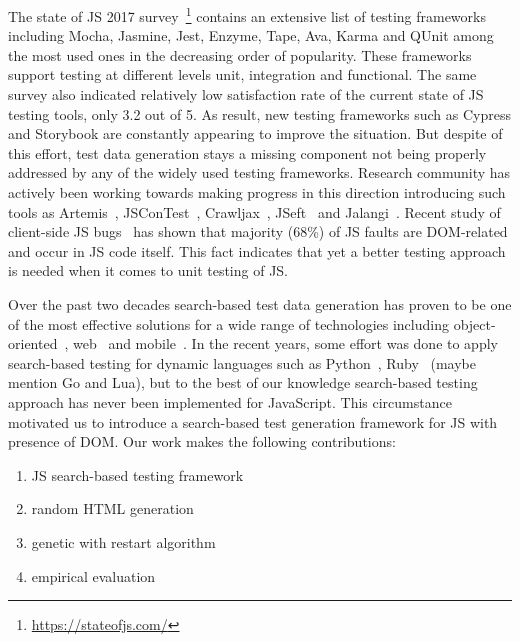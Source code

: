 \documentclass[sigconf]{acmart}
\begin{document}


The state of JS 2017 survey~\footnote{\url{https://stateofjs.com/}} contains an extensive list of testing frameworks including Mocha, Jasmine, Jest, Enzyme, Tape, Ava, Karma and QUnit among the most used ones in the decreasing order of popularity. These frameworks support testing at different levels unit, integration and functional. The same survey also indicated relatively low satisfaction rate of the current state of JS testing tools, only 3.2 out of 5. As result, new testing frameworks such as Cypress and Storybook are constantly appearing to improve the situation. But despite of this effort, test data generation stays a missing component not being properly addressed by any of the widely used testing frameworks. Research community has actively been working towards making progress in this direction introducing such tools as Artemis~\cite{artemis2011}, JSConTest~\cite{heidegger2010contract}, Crawljax~\cite{mesbah2012crawling}, JSeft~\cite{mirshokraie2015jseft} and Jalangi~\cite{sen2013jalangi}. Recent study of client-side JS bugs~\cite{ocariza2017study} has shown that majority (68\%) of JS faults are DOM-related and occur in JS code itself. This fact indicates that yet a better testing approach is needed when it comes to unit testing of JS.

Over the past two decades search-based test data generation has proven to be one of the most effective solutions for a wide range of technologies including object-oriented~\cite{paper}, web~\cite{paper} and mobile~\cite{paper}. In the recent years, some effort was done to apply search-based testing for dynamic languages such as Python~\cite{paper}, Ruby~\cite{paper} (maybe mention Go and Lua), but to the best of our knowledge search-based testing approach has never been implemented for JavaScript. This circumstance motivated us to introduce a search-based test generation framework for JS with presence of DOM. Our work makes the following contributions:
\begin{enumerate}
\item JS search-based testing framework
\item random HTML generation
\item genetic with restart algorithm
\item empirical evaluation 
\end{enumerate} 
\end{document}
